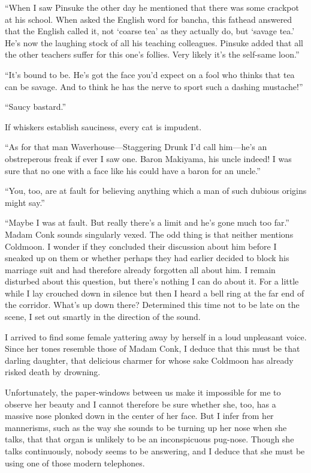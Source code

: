 \documentclass{book}
\begin{document}
``When I saw Pinsuke the other day he mentioned that there was some
crackpot at his school. When asked the English word for bancha, this
fathead answered that the English called it, not `coarse tea' as they
actually do, but `savage tea.' He's now the laughing stock of all his
teaching colleagues. Pinsuke added that all the other teachers suffer
for this one's follies. Very likely it's the self-same loon.''

``It's bound to be. He's got the face you'd expect on a fool who thinks
that tea can be savage. And to think he has the nerve to sport such a
dashing mustache!''

``Saucy bastard.''

If whiskers establish sauciness, every cat is impudent.

``As for that man Waverhouse---Staggering Drunk I'd call him---he's an
obstreperous freak if ever I saw one. Baron Makiyama, his uncle indeed!
I was sure that no one with a face like his could have a baron for an
uncle.''

``You, too, are at fault for believing anything which a man of such
dubious origins might say.''

``Maybe I was at fault. But really there's a limit and he's gone much
too far.'' Madam Conk sounds singularly vexed. The odd thing is that
neither mentions Coldmoon. I wonder if they concluded their discussion
about him before I sneaked up on them or whether perhaps they had
earlier decided to block his marriage suit and had therefore already
forgotten all about him. I remain disturbed about this question, but
there's nothing I can do about it. For a little while I lay crouched
down in silence but then I heard a bell ring at the far end of the
corridor. What's up down there? Determined this time not to be late on
the scene, I set out smartly in the direction of the sound.

I arrived to find some female yattering away by herself in a loud
unpleasant voice. Since her tones resemble those of Madam Conk, I deduce
that this must be that darling daughter, that delicious charmer for
whose sake Coldmoon has already risked death by drowning.

Unfortunately, the paper-windows between us make it impossible for me to
observe her beauty and I cannot therefore be sure whether she, too, has
a massive nose plonked down in the center of her face. But I infer from
her mannerisms, such as the way she sounds to be turning up her nose
when she talks, that that organ is unlikely to be an inconspicuous
pug-nose. Though she talks continuously, nobody seems to be answering,
and I deduce that she must be using one of those modern telephones.
\end{document}
